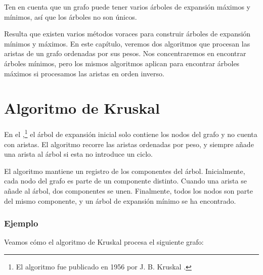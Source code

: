 Ten en cuenta que un grafo puede tener varios árboles de expansión
máximos y mínimos, así que los árboles no son únicos.

Resulta que existen varios métodos voraces para construir árboles
de expansión mínimos y máximos. En este capítulo, veremos dos algoritmos
que procesan las aristas de un grafo ordenadas por sus pesos.
Nos concentraremos en encontrar árboles mínimos, pero los mismos
algoritmos aplican para encontrar árboles máximos si procesamos
las aristas en orden inverso.

\section{Algoritmo de Kruskal}


En el ,\footnote{El algoritmo fue publicado
    en 1956 por J. B. Kruskal \cite{kru56}.} el árbol de expansión
inicial solo contiene los nodos del grafo y no cuenta con aristas.
El algoritmo recorre las aristas ordenadas por peso,
y siempre añade una arista al árbol si esta no introduce un ciclo.

El algoritmo mantiene un registro de los componentes del árbol.
Inicialmente, cada nodo del grafo es parte de un componente distinto.
Cuando una arista se añade al árbol, dos componentes se unen.
Finalmente, todos los nodos son parte del mismo componente,
y un árbol de expansión mínimo se ha encontrado.

\subsubsection{Ejemplo}

Veamos cómo el algoritmo de Kruskal procesa el siguiente grafo:
\begin{center}
\end{center}

